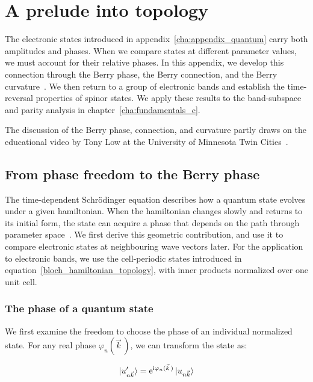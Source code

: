 \chapter{A prelude into topology}
\label{cha:appendix_topology}

The electronic states introduced in appendix~\ref{cha:appendix_quantum} carry both amplitudes and phases.
When we compare states at different parameter values, we must account for their relative phases.
In this appendix, we develop this connection through the Berry phase, the Berry connection, and the Berry curvature~\cite{cayssol2021topological}.
We then return to a group of electronic bands and establish the time-reversal properties of spinor states.
We apply these results to the band-subspace and parity analysis in chapter~\ref{cha:fundamentals_c}.

The discussion of the Berry phase, connection, and curvature partly draws on the educational video by Tony Low at the University of Minnesota Twin Cities~\cite{low2025berry}.

\newpage
\section{From phase freedom to the Berry phase}
\label{sec:berry_phase_topology}

The time-dependent Schrödinger equation describes how a quantum state evolves under a given hamiltonian.
When the hamiltonian changes slowly and returns to its initial form, the state can acquire a phase that depends on the path through parameter space~\cite{resta2000manifestations}.
We first derive this geometric contribution, and use it to compare electronic states at neighbouring wave vectors later.
For the application to electronic bands, we use the cell-periodic states introduced in equation~\eqref{bloch_hamiltonian_topology},
with inner products normalized over one unit cell.

\subsection{The phase of a quantum state}

We first examine the freedom to choose the phase of an individual normalized state.
For any real phase $\varphi_n(\vec{k}\,)$, we can transform the state as:

\begin{equation}
    \ket{u'_{n\vec{k}}}
    =\mathrm{e}^{\mathrm{i}\varphi_n(\vec{k}\,)}\ket{u_{n\vec{k}}}
\label{bloch_phase_freedom_topology}
\end{equation}

